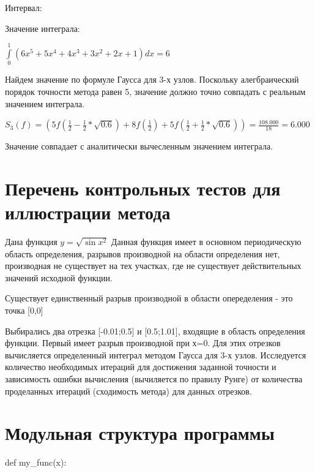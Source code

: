 Интервал: \begin{math} 
	[0;1]
\end{math}

Значение интеграла: 

\begin{math} 
	\int\limits_{0}^{1}(6x^{5}+5x^{4}+4x^{3}+3x^{2}+2x+1)dx=6
\end{math}

Найдем значение по формуле Гаусса для 3-х узлов. Поскольку алегбраический порядок точности метода равен 5, значение должно точно совпадать с реальным значением интеграла.
 
\begin{math} 
	S_{3}(f)=(5f(\frac{1}{2}-\frac{1}{2}*\sqrt{0.6})+8f(\frac{1}{2}) +5f(\frac{1}{2}+\frac{1}{2}*\sqrt{0.6}))= \frac{108.000}{18}=6.000
\end{math}

Значение совпадает с аналитически вычесленным значением интеграла.  
  
\section{Перечень контрольных тестов для иллюстрации метода}

Дана функция 
\begin{math} 
	y=\sqrt{\sin{x^{2}}}
\end{math}
Данная функция имеет в основном периодическую область определения, разрывов производной на области определения нет, производная не существует на тех участках, где не существует действительных значений исходной функции. 

Существует единственный разрыв производной в области опеределения - это точка [0,0]

Выбирались два отрезка [-0.01;0.5] и [0.5;1.01], входящие в область определения функции. Первый имеет разрыв производной при х=0. Для этих отрезков вычисляется определенный интеграл методом Гаусса для 3-х узлов. Исследуется количество необходимых итераций для достижения заданной точности и зависимость ошибки вычисления (вычиляется по правилу Рунге) от количества проделанных итераций (сходимость метода) для данных отрезков. 

\section{Модульная структура программы}

def my\_func(x):

